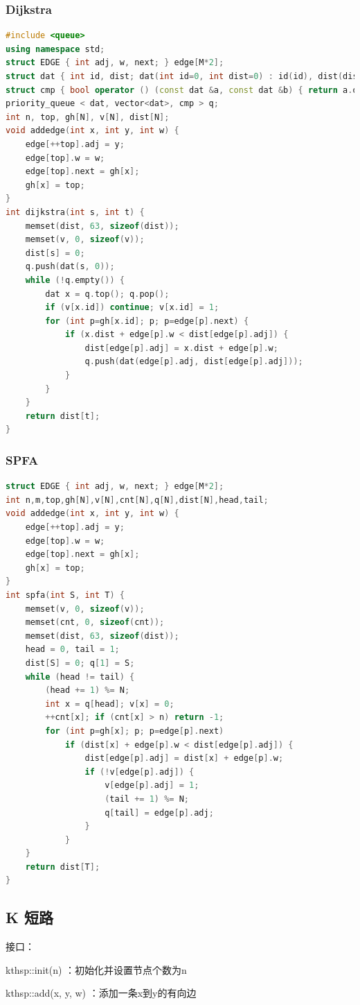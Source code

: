 \documentclass{article}
\begin{document}
\subsubsection{Dijkstra}
\begin{lstlisting}[language=C++]
#include <queue>
using namespace std;
struct EDGE { int adj, w, next; } edge[M*2];
struct dat { int id, dist; dat(int id=0, int dist=0) : id(id), dist(dist) {} };
struct cmp { bool operator () (const dat &a, const dat &b) { return a.dist > b.dist; } };
priority_queue < dat, vector<dat>, cmp > q;
int n, top, gh[N], v[N], dist[N];
void addedge(int x, int y, int w) {
	edge[++top].adj = y;
	edge[top].w = w;
	edge[top].next = gh[x];
	gh[x] = top;
}
int dijkstra(int s, int t) {
	memset(dist, 63, sizeof(dist));
	memset(v, 0, sizeof(v));
	dist[s] = 0;
	q.push(dat(s, 0));
	while (!q.empty()) {
		dat x = q.top(); q.pop();
		if (v[x.id]) continue; v[x.id] = 1;
		for (int p=gh[x.id]; p; p=edge[p].next) {
			if (x.dist + edge[p].w < dist[edge[p].adj]) {
				dist[edge[p].adj] = x.dist + edge[p].w;
				q.push(dat(edge[p].adj, dist[edge[p].adj]));
			}
		}
	}
	return dist[t];
}
\end{lstlisting}
\subsubsection{SPFA}
\begin{lstlisting}[language=C++]
struct EDGE { int adj, w, next; } edge[M*2];
int n,m,top,gh[N],v[N],cnt[N],q[N],dist[N],head,tail;
void addedge(int x, int y, int w) {
	edge[++top].adj = y;
	edge[top].w = w;
	edge[top].next = gh[x];
	gh[x] = top;
}
int spfa(int S, int T) {
	memset(v, 0, sizeof(v));
	memset(cnt, 0, sizeof(cnt));
	memset(dist, 63, sizeof(dist));
	head = 0, tail = 1;
	dist[S] = 0; q[1] = S;
	while (head != tail) {
		(head += 1) %= N;
		int x = q[head]; v[x] = 0;
		++cnt[x]; if (cnt[x] > n) return -1;
		for (int p=gh[x]; p; p=edge[p].next)
			if (dist[x] + edge[p].w < dist[edge[p].adj]) {
				dist[edge[p].adj] = dist[x] + edge[p].w;
				if (!v[edge[p].adj]) {
					v[edge[p].adj] = 1;
					(tail += 1) %= N;
					q[tail] = edge[p].adj;
				}
			}
	}
	return dist[T];
}
\end{lstlisting}
\subsection{K 短路}
接口：

kthsp::init(n) ：初始化并设置节点个数为n

kthsp::add(x, y, w) ：添加一条x到y的有向边
\end{document}
